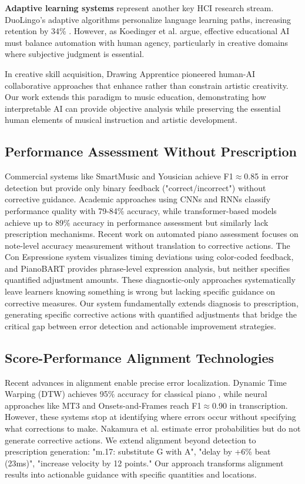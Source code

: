 \documentclass[sigconf,review,anonymous]{acmart}
\begin{document}
\textbf{Adaptive learning systems} represent another key HCI research stream. DuoLingo's adaptive algorithms personalize language learning paths, increasing retention by 34\% \cite{duolingo2019}. However, as Koedinger et al. \cite{koedinger2013} argue, effective educational AI must balance automation with human agency, particularly in creative domains where subjective judgment is essential.

In creative skill acquisition, Drawing Apprentice \cite{davis2016} pioneered human-AI collaborative approaches that enhance rather than constrain artistic creativity. Our work extends this paradigm to music education, demonstrating how interpretable AI can provide objective analysis while preserving the essential human elements of musical instruction and artistic development.

\subsection{Performance Assessment Without Prescription}
Commercial systems like SmartMusic \cite{smartmusic} and Yousician \cite{yousician} achieve F1$\approx$0.85 in error detection but provide only binary feedback ("correct/incorrect") without corrective guidance.
Academic approaches using CNNs \cite{nakano2006} and RNNs \cite{seshadri2021} classify performance quality with 79-84\% accuracy, while transformer-based models \cite{wang2022} achieve up to 89\% accuracy in performance assessment but similarly lack prescription mechanisms.
Recent work on automated piano assessment \cite{sigtia2016} focuses on note-level accuracy measurement without translation to corrective actions.
The Con Espressione system \cite{wu2018} visualizes timing deviations using color-coded feedback, and PianoBART \cite{chou2022} provides phrase-level expression analysis, but neither specifies quantified adjustment amounts.
These diagnostic-only approaches systematically leave learners knowing something is wrong but lacking specific guidance on corrective measures.
Our system fundamentally extends diagnosis to prescription, generating specific corrective actions with quantified adjustments that bridge the critical gap between error detection and actionable improvement strategies.


\subsection{Score-Performance Alignment Technologies}
Recent advances in alignment enable precise error localization. Dynamic Time Warping (DTW) achieves 95\% accuracy for classical piano \cite{romani2015}, while neural approaches like MT3 \cite{mt3} and Onsets-and-Frames \cite{hawthorne2021} reach F1$\approx$0.90 in transcription.
However, these systems stop at identifying where errors occur without specifying what corrections to make.
Nakamura et al. \cite{nakamura2017} estimate error probabilities but do not generate corrective actions.
We extend alignment beyond detection to prescription generation: "m.17: substitute G with A", "delay by +6\% beat (23ms)", "increase velocity by 12 points."
Our approach transforms alignment results into actionable guidance with specific quantities and locations.
\end{document}
